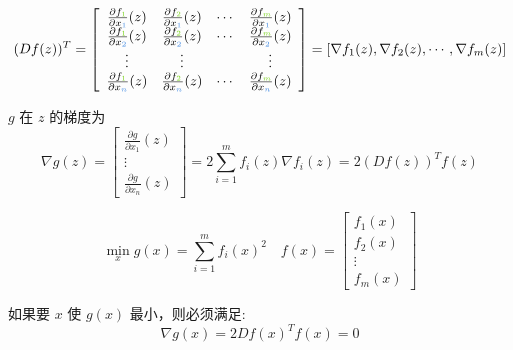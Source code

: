 \begin{equation}\displaystyle (Df(z))^{T} =\left[\begin{array}{ c c c c }
    \frac{\partial f_{\textcolor[rgb]{0.49,0.83,0.13}{1}}}{\partial x_{\textcolor[rgb]{0.29,0.56,0.89}{1}}} (z) & \frac{\partial f_{\textcolor[rgb]{0.49,0.83,0.13}{2}}}{\partial x_{\textcolor[rgb]{0.29,0.56,0.89}{1}}} (z) & \cdots  & \frac{\partial f_{\textcolor[rgb]{0.49,0.83,0.13}{m}}}{\partial x_{\textcolor[rgb]{0.29,0.56,0.89}{1}}} (z)\\
    \frac{\partial f_{\textcolor[rgb]{0.49,0.83,0.13}{1}}}{\partial x_{\textcolor[rgb]{0.29,0.56,0.89}{2}}} (z) & \frac{\partial f_{\textcolor[rgb]{0.49,0.83,0.13}{2}}}{\partial x_{\textcolor[rgb]{0.29,0.56,0.89}{2}}} (z) & \cdots  & \frac{\partial f_{\textcolor[rgb]{0.49,0.83,0.13}{m}}}{\partial x_{\textcolor[rgb]{0.29,0.56,0.89}{2}}} (z)\\
    \vdots  & \vdots  &  & \vdots \\
    \frac{\partial f_{\textcolor[rgb]{0.49,0.83,0.13}{1}}}{\partial x_{\textcolor[rgb]{0.29,0.56,0.89}{n}}} (z) & \frac{\partial f_{\textcolor[rgb]{0.49,0.83,0.13}{2}}}{\partial x_{\textcolor[rgb]{0.29,0.56,0.89}{n}}} (z) & \cdots  & \frac{\partial f_{\textcolor[rgb]{0.49,0.83,0.13}{m}}}{\partial x_{\textcolor[rgb]{0.29,0.56,0.89}{n}}} (z)
    \end{array}\right] =[ \nabla f_{1} (z),\nabla f_{2} (z),\cdots ,\nabla f_{m} (z)]\end{equation}

    $ g $ 在 $ z $ 的梯度为
    \begin{equation}
    \nabla g(z)=\left[\begin{array}{c}
    \frac{\partial g}{\partial x_{1}}(z) \\
    \vdots \\
    \frac{\partial g}{\partial x_{n}}(z)
    \end{array}\right]=2 \sum_{i=1}^{m} f_{i}(z) \nabla f_{i}(z)=2(D f(z))^{T} f(z)
    \end{equation}

\begin{theorem}[非线性最小二乘问题的最优必要条件]
        \begin{equation}
    \min _{x} g(x)=\sum_{i=1}^{m} f_{i}(x)^{2} \quad f(x)=\left[\begin{array}{c}
    f_{1}(x) \\
    f_{2}(x) \\
    \vdots \\
    f_{m}(x)
    \end{array}\right]
    \end{equation}

    如果要 $ x $ 使 $ g(x) $ 最小，则必须满足:
    \begin{equation}
    \nabla g(x)=2 D f(x)^{T} f(x)=0
    \end{equation}
\end{theorem}

